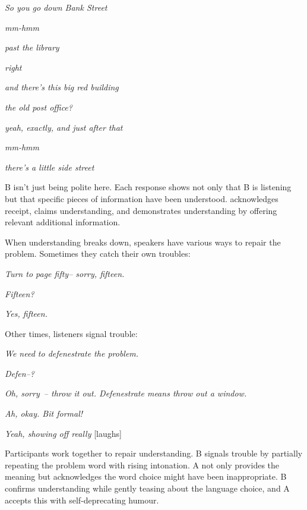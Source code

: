 \ea
\begin{dialogue}
\item[A] \emph{So you go down Bank Street}
\item[B] \emph{mm-hmm}
\item[A] \emph{past the library}
\item[B] \emph{right}
\item[A] \emph{and there's this big red building}
\item[B] \emph{the old post office?}
\item[A] \emph{yeah, exactly, and just after that}
\item[B] \emph{mm-hmm}
\item[A] \emph{there's a little side street}
\end{dialogue}
\z
B isn't just being polite here. Each response shows not only that B is listening but that specific pieces of information have been understood.  acknowledges receipt,  claims understanding, and  demonstrates understanding by offering relevant additional information.

When understanding breaks down, speakers have various ways to repair the problem. Sometimes they catch their own troubles:

\ea
\begin{dialogue}
\item[Teacher] \emph{Turn to page fifty-- sorry, fifteen.}
\item[Student] \emph{Fifteen?}
\item[Teacher] \emph{Yes, fifteen.}
\end{dialogue}
\z
Other times, listeners signal trouble:

\ea
\begin{dialogue}
\item[A] \emph{We need to defenestrate the problem.}
\item[B] \emph{Defen--?}
\item[A] \emph{Oh, sorry~-- throw it out. Defenestrate means throw out a window.}
\item[B] \emph{Ah, okay. Bit formal!}
\item[A] \emph{Yeah, showing off really} [laughs]
\end{dialogue}
\z
Participants work together to repair understanding. B signals trouble by partially repeating the problem word with rising intonation. A not only provides the meaning but acknowledges the word choice might have been inappropriate. B confirms understanding while gently teasing about the language choice, and A accepts this with self-deprecating humour.

